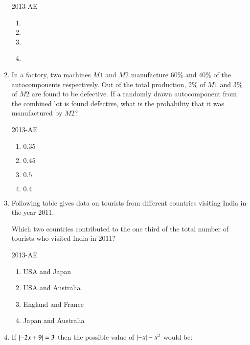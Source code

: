 \documentclass[journal]{IEEEtran}
\begin{document}
\begin{enumerate}
\hfill{2013-AE}

\begin{enumerate}
    \item {}
    \item {}
    \item {}
    \item {}\\
\end{enumerate}

\item \label{Q.62} In a factory, two machines $M1$ and $M2$ manufacture $60\%$ and $40\%$ of the autocomponents respectively. Out of the total production, $2\%$ of $M1$ and $3\%$ of $M2$ are found to be defective. If a randomly drawn autocomponent from the combined lot is found defective, what is the probability that it was manufactured by $M2$?

\hfill{2013-AE}

\begin{enumerate}
    \item $0.35$
    \item $0.45$
    \item $0.5$
    \item $0.4$\\
\end{enumerate}

\item \label{Q.63} Following table gives data on tourists from different countries visiting India in the year 2011.

\begin{table}[h!]    
  \centering
  
\end{table}

Which two countries contributed to the one third of the total number of tourists who visited India in 2011?

\hfill{2013-AE}

\begin{enumerate}
    \item USA and Japan
    \item USA and Australia
    \item England and France
    \item Japan and Australia\\
\end{enumerate}

\item \label{Q.64} If $\left\vert -2x + 9 \right\vert = 3$ then the possible value of $\left\vert -x\right\vert - x^2$ would be:


\end{enumerate}
\end{document}
